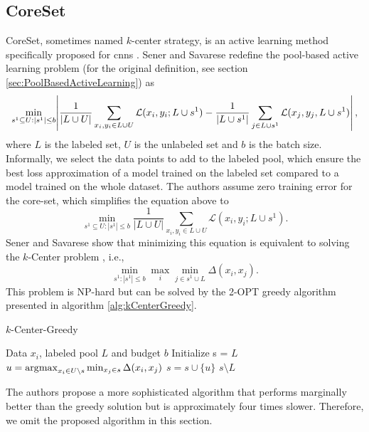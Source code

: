 \subsection{CoreSet}
\label{sec:Related_work:Active_Learning:CoreSet}
CoreSet, sometimes named $k$-center strategy, is an active learning method specifically proposed for \glspl{cnn} \cite{sener2017active}.
Sener and Savarese redefine the pool-based active learning problem (for the original definition, see 
section \ref{sec:PoolBasedActiveLearning}) as 
\begin{equation}
    \min_{s^1 \subseteq U: |s^1| \leq b } \abs{\frac{1}{|L \cup U|} \sum_{x_i,y_i \in L \cup U} \mathcal{L}(x_i,y_i;L \cup s^1) - \frac{1}{|L \cup s^1|} 
    \sum_{j \in L \cup s^1} \mathcal{L}(x_j,y_j,L \cup s^1)}, 
\end{equation}
where $L$ is the labeled set, $U$ is the unlabeled set and $b$ is the batch size.
Informally, we select the data points to add to the labeled pool, which ensure the best loss approximation
of a model trained on the labeled set compared to a model trained on the whole dataset. The authors assume zero training error for the core-set, which
simplifies the equation above to
\begin{equation}
    \min_{s^1 \subseteq U: |s^1| \leq b } \frac{1}{|L \cup U|} \sum_{x_i,y_i \in L \cup U} \mathcal{L}(x_i,y_i;L \cup s^1).
\end{equation}
Sener and Savarese show that minimizing this equation is equivalent to solving the $k$-Center problem \cite{wolf2011facility}, i.e.,
\begin{equation}
    \min_{s^1: |s^1| \leq b} \max_i \min_{j \in s^1 \cup L}  \Delta (x_i,x_j).
\end{equation}
This problem is NP-hard but can be solved by the 2-OPT greedy algorithm presented in algorithm \ref{alg:kCenterGreedy}.
\begin{algorithm}
    \caption{$k$-Center-Greedy} \label{alg:kCenterGreedy}
    \begin{algorithmic}
        \Require Data $x_i$, labeled pool $L$ and budget $b$
        \State Initialize s = $L$
        \Repeat
        \State $u = \operatorname*{\arg\!\max}_{x_i \in U \setminus s} \min_{x_j \in s} \Delta(x_i,x_j)$
        \State $s = s \cup \{u\}$
        \return $s \setminus L$
    \end{algorithmic}
\end{algorithm}
The authors propose a more sophisticated algorithm that performs marginally better than the greedy solution but is approximately 
four times slower. Therefore, we omit the proposed algorithm in this section.

